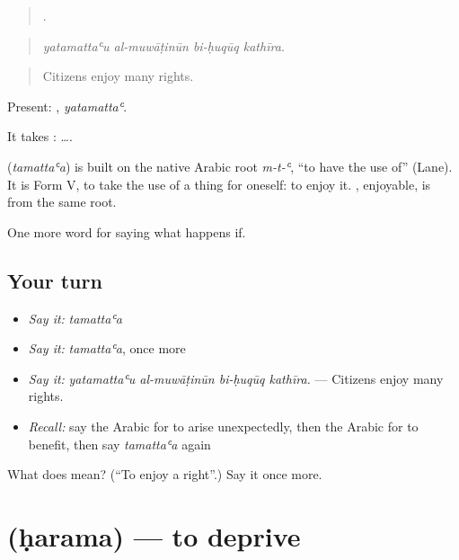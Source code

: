 \begin{quote}
   .
\end{quote}

\begin{quote}
\emph{yatamattaʿu al-muwāṭinūn bi-ḥuqūq kathīra.}
\end{quote}

\begin{quote}
Citizens enjoy many rights.
\end{quote}

Present: , \emph{yatamattaʿ}.

It takes :   ….

\begin{cousinweb}
\textbf{} (\emph{tamattaʿa}) is built on the native Arabic root \emph{m-t-ʿ}, \textquotedblleft{}to have the use of\textquotedblright{} (Lane). It is Form V, to take the use of a thing for oneself: to enjoy it. , enjoyable, is from the same root.
\end{cousinweb}

\begin{grammarlens}[title={What you've built}]
One more word for saying what happens if.
\end{grammarlens}

\subsection*{Your turn}
\begin{itemize}
\raggedright
  \item \emph{Say it:} \emph{tamattaʿa}
  \item \emph{Say it:} \emph{tamattaʿa}, once more
  \item \emph{Say it:} \emph{yatamattaʿu al-muwāṭinūn bi-ḥuqūq kathīra.} — Citizens enjoy many rights.
  \item \emph{Recall:} say the Arabic for to arise unexpectedly, then the Arabic for to benefit, then say \emph{tamattaʿa} again
\end{itemize}

\begin{tcolorbox}[breakable,colback=teal!4,colframe=teal!35!black,title={Before you move on}]
What does  mean? (\textquotedblleft{}To enjoy a right\textquotedblright{}.) Say it once more.
\end{tcolorbox}
\section[\texorpdfstring{\ar{حرم} (ḥarama)}{حرم (ḥarama)}]{ (ḥarama) — to deprive}

